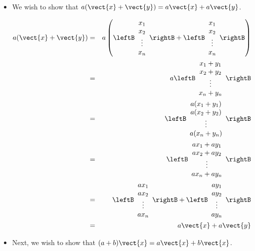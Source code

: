\begin{solution}
\begin{itemize}
\item
We wish to show that $a (\vect{x} + \vect{y}) = a\vect{x} + a\vect{y}$. 

\begin{eqnarray*}
a (\vect{x} + \vect{y}) &=& 
a \left(
\leftB \begin{array}{c}
x_1 \\
x_2 \\
\vdots \\
x_n
\end{array}\rightB + \leftB \begin{array}{c}
x_1 \\
x_2 \\
\vdots \\
x_n
\end{array}\rightB \right) \\
&=& 
a \leftB \begin{array}{c}
x_1 + y_1 \\
x_2 + y_2\\
\vdots \\
x_n + y_n
\end{array}\rightB \\
&=& 
\leftB \begin{array}{c}
a(x_1 +y_1)\\
a(x_2 +y_2)\\
\vdots \\
a(x_n+y_n)
\end{array}\rightB \\
& =& \leftB \begin{array}{c}
ax_1+ay_1 \\
ax_2+ay_2 \\
\vdots \\
ax_n+ay_n
\end{array}\rightB \\
&=&
\leftB \begin{array}{c}
ax_1 \\
ax_2 \\
\vdots \\
ax_n
\end{array}\rightB+
\leftB \begin{array}{c}
ay_1 \\
ay_2 \\
\vdots \\
ay_n
\end{array}\rightB\\
&=& a\vect{x} + a\vect{y}
\end{eqnarray*}

\item 
Next, we wish to show that $(a+b)\vect{x} = a\vect{x} + b\vect{x}$.


\end{itemize}
\end{solution}
